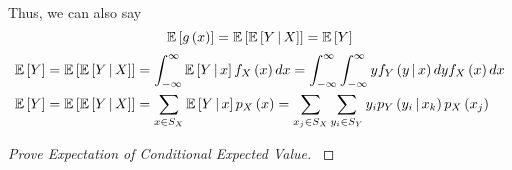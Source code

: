 \begin{definition}
\begin{remark}
				Thus, we can also say
				\begin{equation} \label{eq:Expected Value of Conditional Expected Value of Multiple Variables}
					\operatorname{\mathbb{E}} \left[ g \left( x \right) \right] = \operatorname{\mathbb{E}} \left[ \operatorname{\mathbb{E}} \left[ Y \operatorname{\vert} X \right] \right] = \operatorname{\mathbb{E}} \left[ Y \right]
				\end{equation}
				\begin{subequations}
					\begin{align} \label{eq:Joint PDF of Multiple Continuous Random Variables}
						\operatorname{\mathbb{E}} \left[ Y \right]
						= \operatorname{\mathbb{E}} \left[ \operatorname{\mathbb{E}} \left[ Y \operatorname{\vert} X \right] \right]
						&= \int_{-\infty}^{\infty} \operatorname{\mathbb{E}} \left[ Y \operatorname{\vert} x \right] f_{X} \left( x \right) dx
						= \int_{-\infty}^{\infty} \int_{-\infty}^{\infty} y f_{Y} \left( y \operatorname{\vert} x \right) dy f_{X} \left( x \right) dx \\
					 \label{eq:Joint PDF of Multiple Discrete Random Variables}
						\operatorname{\mathbb{E}} \left[ Y \right]
						= \operatorname{\mathbb{E}} \left[ \operatorname{\mathbb{E}} \left[ Y \operatorname{\vert} X \right] \right]
						&= \sum_{x \in S_{X}} \operatorname{\mathbb{E}} \left[ Y \operatorname{\vert} x \right] p_{X} \left( x \right)
						= \sum_{x_{j} \in S_{X}} \sum_{y_{i} \in S_{Y}} y_{i} p_{Y} \left( y_{i} \operatorname{\vert} x_{k} \right) p_{X} \left( x_{j} \right)
					\end{align}
				\end{subequations}
			\end{remark}
		\end{definition}
		\begin{proof}[Prove Expectation of Conditional Expected Value] \label{proof:Expected Value of Conditional Expected Value of Multiple Variables}
		\end{proof}
